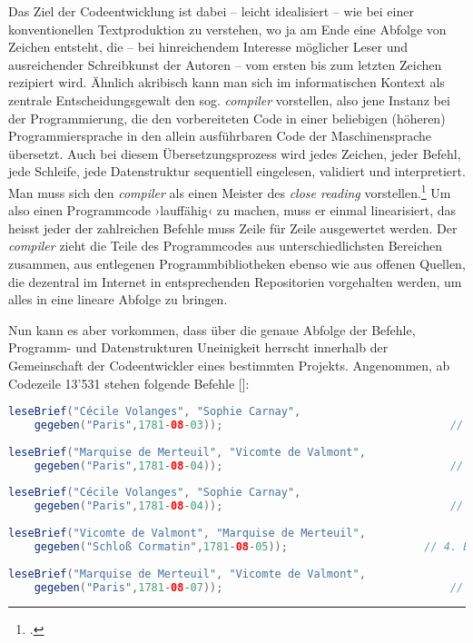 \documentclass[a4paper,12pt]{article}
\newcommand{\inanf}[1]{›#1‹}
\newcommand{\anzeige}{\textbf{\color{hokkaido}\huge{\raisebox{-0.18ex}{$\bullet$}}\color{black}}}
\begin{document}
Das Ziel der Codeentwicklung ist dabei – leicht idealisiert – wie bei einer konventionellen Textproduktion zu verstehen, wo ja am Ende eine Abfolge von Zeichen entsteht, die – bei hinreichendem Interesse möglicher Leser und ausreichender Schreibkunst der Autoren – vom ersten bis zum letzten Zeichen rezipiert wird. Ähnlich akribisch kann man sich im informatischen Kontext als zentrale Entscheidungsgewalt den sog. \emph{compiler} vorstellen, also jene Instanz bei der Programmierung, die den vorbereiteten Code in einer beliebigen (höheren) Programmiersprache in den allein ausführbaren Code der Maschinensprache übersetzt. Auch bei diesem Übersetzungsprozess wird jedes Zeichen, jeder Befehl, jede Schleife, jede Datenstruktur sequentiell eingelesen, validiert und interpretiert. Man muss sich den \emph{compiler} als einen Meister des \emph{close reading} vorstellen.\footcite[Hier wäre noch auf die kodifizierende Funktion, das Schliessen des Codes, hinzuweisen, die ja auch vom Compiler vorgenommen wird, vgl.][]{krajewski+vismann:2009} Um also einen Programmcode \inanf{lauffähig} zu machen, muss er einmal linearisiert, das heisst jeder der zahlreichen Befehle muss Zeile für Zeile ausgewertet werden. Der \emph{compiler} zieht die Teile des Programmcodes aus unterschiedlichsten Bereichen zusammen, aus entlegenen Programmbibliotheken ebenso wie aus offenen Quellen, die dezentral im Internet in entsprechenden Repositorien vorgehalten werden, um alles in eine lineare Abfolge zu bringen. 

Nun kann es aber vorkommen, dass über die genaue Abfolge der Befehle, Programm- und Datenstrukturen Uneinigkeit herrscht innerhalb der Gemeinschaft der Codeentwickler eines bestimmten Projekts. Angenommen, ab Codezeile 13'531 stehen folgende Befehle [\anzeige]:
\begin{lstlisting}[language=Java, firstnumber=13531]
leseBrief("Cécile Volanges", "Sophie Carnay", 
	gegeben("Paris",1781-08-03));                           		// 1. Brief
	
leseBrief("Marquise de Merteuil", "Vicomte de Valmont", 
	gegeben("Paris",1781-08-04));                           		// 2. Brief
	
leseBrief("Cécile Volanges", "Sophie Carnay", 
	gegeben("Paris",1781-08-04));                           		// 3. Brief
	
leseBrief("Vicomte de Valmont", "Marquise de Merteuil", 
	gegeben("Schloß Cormatin",1781-08-05));                 	// 4. Brief
	
leseBrief("Marquise de Merteuil", "Vicomte de Valmont", 
	gegeben("Paris",1781-08-07));                           		// 5. Brief
\end{lstlisting}
\end{document}
